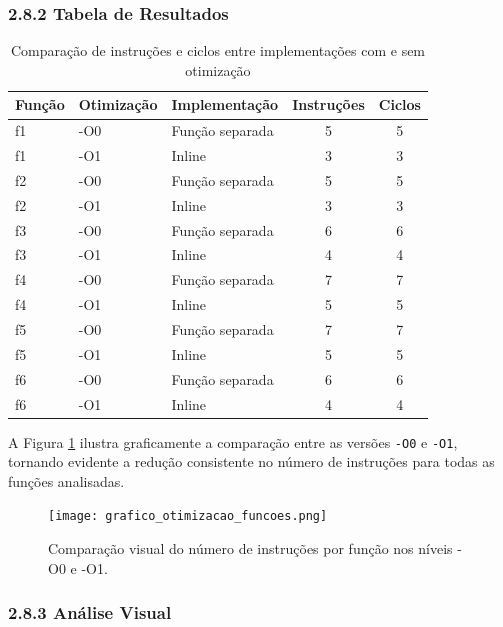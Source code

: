 \documentclass[12pt,a4paper]{article}
\begin{document}
\subsubsection*{2.8.2 Tabela de Resultados}
\begin{table}[h!]
    \centering
    \begin{tabular}{|l|l|l|c|c|}
        \hline
        \textbf{Função} & \textbf{Otimização} & \textbf{Implementação} & \textbf{Instruções} & \textbf{Ciclos} \\
        \hline
        f1 & -O0 & Função separada & 5 & 5 \\
        f1 & -O1 & Inline & 3 & 3 \\
        \hline
        f2 & -O0 & Função separada & 5 & 5 \\
        f2 & -O1 & Inline & 3 & 3 \\
        \hline
        f3 & -O0 & Função separada & 6 & 6 \\
        f3 & -O1 & Inline & 4 & 4 \\
        \hline
        f4 & -O0 & Função separada & 7 & 7 \\
        f4 & -O1 & Inline & 5 & 5 \\
        \hline
        f5 & -O0 & Função separada & 7 & 7 \\
        f5 & -O1 & Inline & 5 & 5 \\
        \hline
        f6 & -O0 & Função separada & 6 & 6 \\
        f6 & -O1 & Inline & 4 & 4 \\
        \hline
    \end{tabular}
    \caption{Comparação de instruções e ciclos entre implementações com e sem otimização}
\end{table}

A Figura \ref{fig:otimizacao_funcoes} ilustra graficamente a comparação entre as versões \texttt{-O0} e \texttt{-O1}, tornando evidente a redução consistente no número de instruções para todas as funções analisadas.

\begin{figure}[H]
\centering
\texttt{[image: grafico\_otimizacao\_funcoes.png]}
\caption{Comparação visual do número de instruções por função nos níveis -O0 e -O1.}
\label{fig:otimizacao_funcoes}
\end{figure}

\subsubsection*{2.8.3 Análise Visual}
\end{document}
